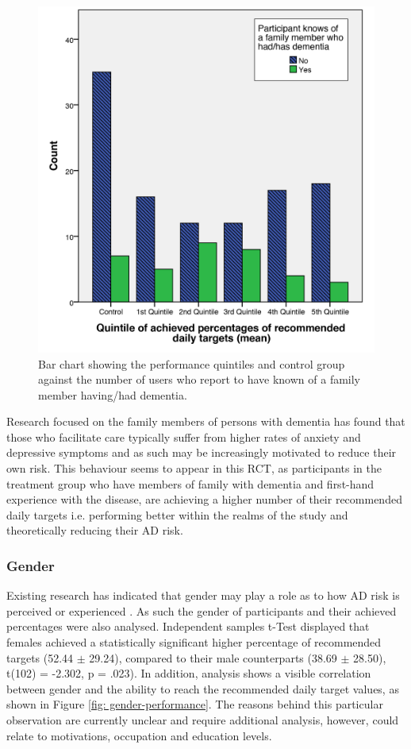 \begin{figure}[h]
	\centering
    \includegraphics[scale=0.18, angle=0]{Files/prevention-study-3/figures/family-quintile}
  	\caption{Bar chart showing the performance quintiles and control group against the number of users who report to have known of a family member having/had dementia.}
    \label{fig: family-quintile}
\end{figure}

Research focused on the family members of persons with dementia has found that those who facilitate care typically suffer from higher rates of anxiety and depressive symptoms \cite{Mahoney2005} and as such may be increasingly motivated to reduce their own risk. This behaviour seems to appear in this RCT, as participants in the treatment group who have members of family with dementia and first-hand experience with the disease, are achieving a higher number of their recommended daily targets i.e. performing better within the realms of the study and theoretically reducing their AD risk.

\subsubsection{Gender}
Existing research has indicated that gender may play a role as to how AD risk is perceived or experienced \cite{Rose-Rego1998, Thompson2004}. As such the gender of participants and their achieved percentages were also analysed. Independent samples t-Test displayed that females achieved a statistically significant higher percentage of recommended targets (52.44 $\pm$ 29.24), compared to their male counterparts (38.69 $\pm$ 28.50), t(102) = -2.302, p = .023). In addition, analysis shows a visible correlation between gender and the ability to reach the recommended daily target values, as shown in Figure \ref{fig: gender-performance}. The reasons behind this particular observation are currently unclear and require additional analysis, however, could relate to motivations, occupation and education levels.

